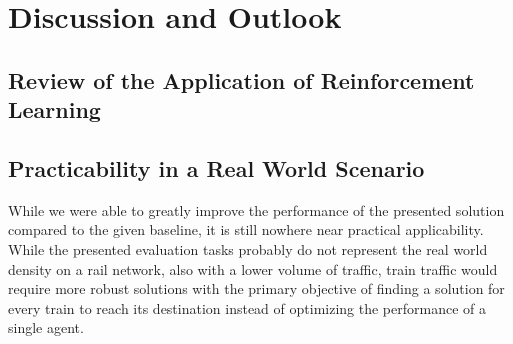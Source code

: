 %
%

\chapter{Discussion and Outlook}
\label{chap.diskussion}
\section{Review of the Application of Reinforcement Learning}\label{discussion_rl}



\section{Practicability in a Real World Scenario}\label{discussion_real_world}
While we were able to greatly improve the performance of the presented solution compared to the given baseline, it is still nowhere near practical applicability. While the presented evaluation tasks probably do not represent the real world density on a rail network, also with a lower volume of traffic, train traffic would require more robust solutions with the primary objective of finding a solution for every train to reach its destination instead of optimizing the performance of a single agent.

